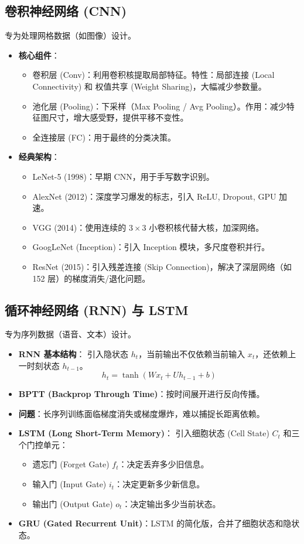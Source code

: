 \documentclass[a4paper, 11pt]{ctexart}
\begin{document}
\subsection{卷积神经网络 (CNN)}
专为处理网格数据（如图像）设计。
\begin{itemize}
    \item \textbf{核心组件}：
    \begin{itemize}
        \item 卷积层 (Conv)：利用卷积核提取局部特征。特性：局部连接 (Local Connectivity) 和 权值共享 (Weight Sharing)，大幅减少参数量。
        \item 池化层 (Pooling)：下采样（Max Pooling / Avg Pooling）。作用：减少特征图尺寸，增大感受野，提供平移不变性。
        \item 全连接层 (FC)：用于最终的分类决策。
    \end{itemize}
    \item \textbf{经典架构}：
    \begin{itemize}
        \item LeNet-5 (1998)：早期 CNN，用于手写数字识别。
        \item AlexNet (2012)：深度学习爆发的标志，引入 ReLU, Dropout, GPU 加速。
        \item VGG (2014)：使用连续的 $3 \times 3$ 小卷积核代替大核，加深网络。
        \item GoogLeNet (Inception)：引入 Inception 模块，多尺度卷积并行。
        \item ResNet (2015)：引入残差连接 (Skip Connection)，解决了深层网络（如 152 层）的梯度消失/退化问题。
    \end{itemize}
\end{itemize}

\subsection{循环神经网络 (RNN) 与 LSTM}
专为序列数据（语音、文本）设计。
\begin{itemize}
    \item \textbf{RNN 基本结构}：
    引入隐状态 $h_t$，当前输出不仅依赖当前输入 $x_t$，还依赖上一时刻状态 $h_{t-1}$。
    $$ h_t = \tanh(W x_t + U h_{t-1} + b) $$
    \item \textbf{BPTT (Backprop Through Time)}：按时间展开进行反向传播。
    \item \textbf{问题}：长序列训练面临梯度消失或梯度爆炸，难以捕捉长距离依赖。
    \item \textbf{LSTM (Long Short-Term Memory)}：
    引入细胞状态 (Cell State) $C_t$ 和三个门控单元：
    \begin{itemize}
        \item 遗忘门 (Forget Gate) $f_t$：决定丢弃多少旧信息。
        \item 输入门 (Input Gate) $i_t$：决定更新多少新信息。
        \item 输出门 (Output Gate) $o_t$：决定输出多少当前状态。
    \end{itemize}
    \item \textbf{GRU (Gated Recurrent Unit)}：LSTM 的简化版，合并了细胞状态和隐状态。
\end{itemize}
\end{document}
